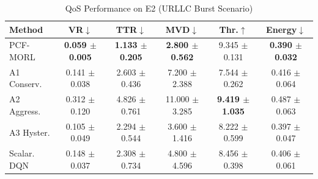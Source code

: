 \begin{table}[t]
\centering
\caption{QoS Performance on E2 (URLLC Burst Scenario)}
\label{tab:qos_e2}
\begin{tabular}{lccccc}
\toprule
Method & VR$\downarrow$ & TTR$\downarrow$ & MVD$\downarrow$ & Thr.$\uparrow$ & Energy$\downarrow$ \\
\midrule
PCF-MORL & \textbf{0.059 $\pm$ 0.005} & \textbf{1.133 $\pm$ 0.205} & \textbf{2.800 $\pm$ 0.562} & 9.345 $\pm$ 0.131 & \textbf{0.390 $\pm$ 0.032} \\
A1 Conserv. & 0.141 $\pm$ 0.038 & 2.603 $\pm$ 0.436 & 7.200 $\pm$ 2.388 & 7.544 $\pm$ 0.262 & 0.416 $\pm$ 0.064 \\
A2 Aggress. & 0.312 $\pm$ 0.120 & 4.826 $\pm$ 0.761 & 11.000 $\pm$ 3.285 & \textbf{9.419 $\pm$ 1.035} & 0.487 $\pm$ 0.063 \\
A3 Hyster. & 0.105 $\pm$ 0.049 & 2.294 $\pm$ 0.544 & 3.600 $\pm$ 1.416 & 8.222 $\pm$ 0.599 & 0.397 $\pm$ 0.047 \\
Scalar. DQN & 0.148 $\pm$ 0.037 & 2.308 $\pm$ 0.734 & 4.800 $\pm$ 4.596 & 8.456 $\pm$ 0.398 & 0.406 $\pm$ 0.061 \\
\bottomrule
\end{tabular}
\end{table}